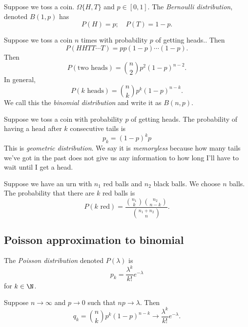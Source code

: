 \documentclass[a4paper]{article}
\begin{document}
\begin{defi}
  Suppose we toss a coin. $\Omega\{H, T\}$ and $p\in [0, 1]$. The \emph{Bernoulli distribution}, denoted $B(1, p)$ has
  \[
    P(H) = p;\quad P(T) = 1- p.
  \]
\end{defi}

\begin{defi}
  Suppose we toss a coin $n$ times with probability $p$ of getting heads.. Then
  \[
    P(HHTT\cdots T) = pp(1 - p)\cdots (1 - p).
  \]
  Then
  \[
    P(\text{two heads}) = \binom{n}{2}p^2(1 - p)^{n -2}.
  \]
  In general,
  \[
    P(k\text{ heads}) = \binom{n}{k}p^k(1 - p)^{n - k}.
  \]
  We call this the \emph{binomial distribution} and write it as $B(n, p)$.
\end{defi}

\begin{defi}
  Suppose we toss a coin with probability $p$ of getting heads. The probability of having a head after $k$ consecutive tails is
  \[
    p_k = (1- p)^k p
  \]
  This is \emph{geometric distribution}. We say it is \emph{memoryless} because how many tails we've got in the past does not give us any information to how long I'll have to wait until I get a head.
\end{defi}

\begin{defi}
  Suppose we have an urn with $n_1$ red balls and $n_2$ black balls. We choose $n$ balls. The probability that there are $k$ red balls is
  \[
    P(k\text{ red}) = \frac{\binom{n_1}{k}\binom{n_2}{n - k}}{\binom{n_1 + n_2}{n}}.
  \]
\end{defi}

\subsection{Poisson approximation to binomial}
\begin{defi}
  The \emph{Poisson distribution} denoted $P(\lambda)$ is
  \[
    p_k = \frac{\lambda^k}{k!}e^{-\lambda}
  \]
  for $k\in \N$.
\end{defi}

\begin{thm}
  Suppose $n\to \infty$ and $p\to 0$ such that $np \to \lambda$. Then
  \[
    q_k = \binom{n}{k}p^k(1 -p)^{n - k} \to \frac{\lambda^k}{k!}e^{-\lambda}.
  \]
\end{thm}
\end{document}
